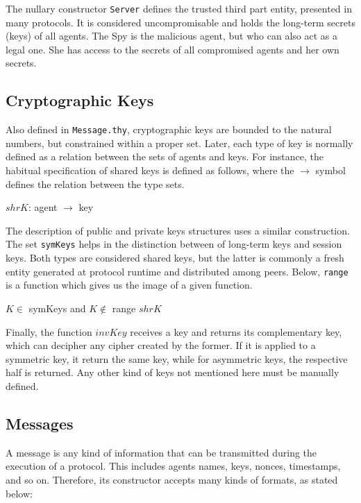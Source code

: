 The nullary constructor \texttt{Server} defines the trusted third part entity, presented in many protocols. It is considered uncompromisable and holds the long-term secrets (keys) of all agents. The Spy is the malicious agent, but who can also act as a legal one. She has access to the secrets of all compromised agents and her own secrets.



\subsection{Cryptographic Keys}
Also defined in \texttt{Message.thy}, cryptographic keys are bounded to the natural numbers, but constrained within a proper set. Later, each type of key is normally defined as a relation between the sets of agents and keys. For instance, the habitual specification of shared keys is defined as follows, where the \( \longrightarrow \) symbol defines the relation between the type sets.

\begin{center}
  {\ttfamily \(shrK\): agent \( \longrightarrow \) key}
\end{center}

The description of public and private keys structures uses a similar construction. The set \texttt{symKeys} helps in the distinction between of long-term keys and session keys. Both types are considered shared keys, but the latter is commonly a fresh entity generated at protocol runtime and distributed among peers. Below, \texttt{range} is a function which gives us the image of a given function.

\begin{center}
  {\ttfamily \(K \in \) symKeys} and {\ttfamily \(K \notin \) range \(shrK\)}
\end{center}

Finally, the function \(invKey\) receives a key and returns its complementary key, which can decipher any cipher created by the former. If it is applied to a symmetric key, it return the same key, while for asymmetric keys, the respective half is returned. Any other kind of keys not mentioned here must be manually defined.



\subsection{Messages}
A message is any kind of information that can be transmitted during the execution of a protocol. This includes agents names, keys, nonces, timestamps, and so on. Therefore, its constructor accepts many kinds of formats, as stated below:

